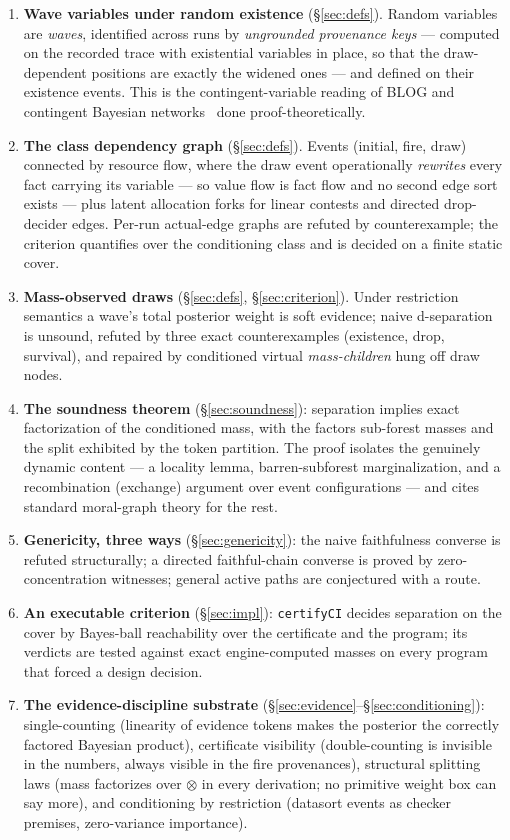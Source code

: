 \documentclass[11pt]{article}
\newcommand{\tensor}{\otimes}
\theoremstyle{definition}
\theoremstyle{remark}
\begin{document}
\begin{enumerate}
\item \textbf{Wave variables under random existence}
  (\S\ref{sec:defs}).  Random variables are \emph{waves}, identified
  across runs by \emph{ungrounded provenance keys} --- computed on the
  recorded trace with existential variables in place, so that the
  draw-dependent positions are exactly the widened ones --- and defined
  on their existence events.  This is the contingent-variable reading
  of BLOG and contingent Bayesian networks~\cite{MilchCBN2005,MilchBLOG2005}
  done proof-theoretically.
\item \textbf{The class dependency graph} (\S\ref{sec:defs}).  Events
  (initial, fire, draw) connected by resource flow, where the draw
  event operationally \emph{rewrites} every fact carrying its variable
  --- so value flow is fact flow and no second edge sort exists ---
  plus latent allocation forks for linear contests and directed
  drop-decider edges.  Per-run actual-edge graphs are refuted by
  counterexample; the criterion quantifies over the conditioning class
  and is decided on a finite static cover.
\item \textbf{Mass-observed draws} (\S\ref{sec:defs},
  \S\ref{sec:criterion}).  Under restriction semantics a wave's total
  posterior weight is soft evidence; naive d-separation is unsound,
  refuted by three exact counterexamples (existence, drop,
  survival), and repaired by conditioned virtual \emph{mass-children}
  hung off draw nodes.
\item \textbf{The soundness theorem} (\S\ref{sec:soundness}):
  separation implies exact factorization of the conditioned mass, with
  the factors sub-forest masses and the split exhibited by the token
  partition.  The proof isolates the genuinely dynamic content ---
  a locality lemma, barren-subforest marginalization, and a
  recombination (exchange) argument over event configurations --- and
  cites standard moral-graph theory for the rest.
\item \textbf{Genericity, three ways} (\S\ref{sec:genericity}): the
  naive faithfulness converse is refuted structurally; a directed
  faithful-chain converse is proved by zero-concentration witnesses;
  general active paths are conjectured with a route.
\item \textbf{An executable criterion} (\S\ref{sec:impl}):
  \texttt{certifyCI} decides separation on the cover by Bayes-ball
  reachability over the certificate and the program; its verdicts are
  tested against exact engine-computed masses on every program that
  forced a design decision.
\item \textbf{The evidence-discipline substrate}
  (\S\ref{sec:evidence}--\S\ref{sec:conditioning}): single-counting
  (linearity of evidence tokens makes the posterior the correctly
  factored Bayesian product), certificate visibility (double-counting
  is invisible in the numbers, always visible in the fire
  provenances), structural splitting laws (mass factorizes over
  $\tensor$ in every derivation; no primitive weight box can say
  more), and conditioning by restriction (datasort events as checker
  premises, zero-variance importance).
\end{enumerate}
\end{document}
